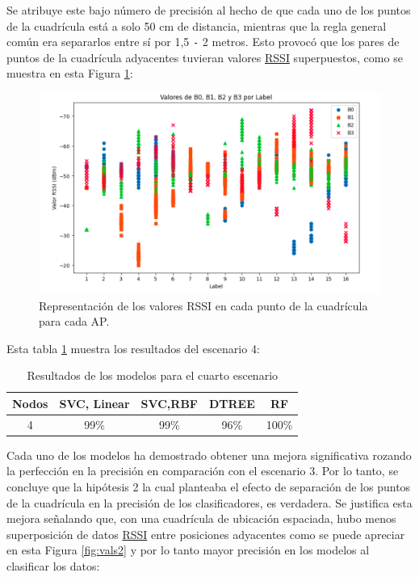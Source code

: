Se atribuye este bajo número de precisión al hecho de que cada uno de los puntos de la cuadrícula está a solo 50 cm de distancia, mientras que la regla general común era separarlos entre sí por 1,5 \texttt{-} 2 metros. Esto provocó que los pares de puntos de la cuadrícula adyacentes tuvieran valores \hyperlink{RSSI}{RSSI} superpuestos, como se muestra en esta Figura \ref{fig:vals1}:



\begin{figure}[H]
  \centering
  \includegraphics[scale=0.4]{figs/vals1} %
  \caption{ Representación de los valores RSSI en cada punto de la cuadrícula para cada AP.}
  \label{fig:vals1}
\end{figure} 

Esta tabla \ref{cuadro:tabla2} muestra los resultados del escenario 4:

\begin{table}[H]
\begin{center}
\begin{tabular}{|c|c|c|c|c|}
\hline
\textbf{Nodos} & \textbf{SVC, Linear} & \textbf{SVC,RBF} & \textbf{DTREE} & \textbf{RF} \\
\hline
4 & 99\% & 99\% & 96\% & 100\% \\  
\hline
\end{tabular}
\caption{Resultados de los modelos para el cuarto escenario}
\label{cuadro:tabla2}
\end{center}
\end{table}


Cada uno de los modelos ha demostrado obtener una mejora significativa rozando la perfección en la precisión en comparación con el escenario 3. Por lo tanto, se concluye que la hipótesis 2 la cual planteaba el efecto de separación de los puntos de la cuadrícula en la precisión de los clasificadores, es verdadera. Se justifica esta mejora señalando que, con una cuadrícula de ubicación espaciada, hubo menos superposición de datos \hyperlink{RSSI}{RSSI} entre posiciones adyacentes como se puede apreciar en esta Figura \ref{fig:vals2} y por lo tanto mayor precisión en los modelos al clasificar los datos:

